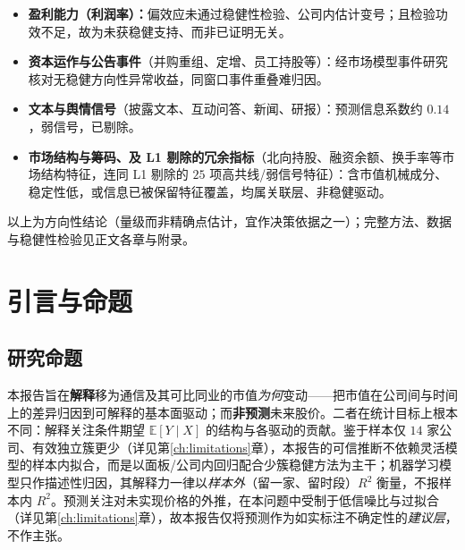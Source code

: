 \documentclass[UTF8, a4paper, fontset=none, zihao=-4]{ctexrep}
\begin{document}
{\vspace{7pt}
\begin{itemize}\setlength{\itemsep}{2pt}\setlength{\parskip}{0pt}\setlength{\topsep}{2pt}
\item \textbf{盈利能力（利润率）：}偏效应未通过稳健性检验、公司内估计变号；且检验功效不足，故为未获稳健支持、而非已证明无关。
\item \textbf{资本运作与公告事件}（并购重组、定增、员工持股等）：经市场模型事件研究核对无稳健方向性异常收益，同窗口事件重叠难归因。
\item \textbf{文本与舆情信号}（披露文本、互动问答、新闻、研报）：预测信息系数约 $0.14$，弱信号，已剔除。
\item \textbf{市场结构与筹码、及 L1 剔除的冗余指标}（北向持股、融资余额、换手率等市场结构特征，连同 L1 剔除的 $25$ 项高共线/弱信号特征）：含市值机械成分、稳定性低，或信息已被保留特征覆盖，均属关联层、非稳健驱动。
\end{itemize}

\vspace{6pt}
以上为方向性结论（量级而非精确点估计，宜作决策依据之一）；完整方法、数据与稳健性检验见正文各章与附录。
\par}
\clearpage

\tableofcontents
\thispagestyle{fancy}
\clearpage

\chapter{引言与命题}

\section{研究命题}
本报告旨在\textbf{解释}移为通信及其可比同业的市值\emph{为何}变动——把市值在公司间与时间上的差异归因到可解释的基本面驱动；而\textbf{非预测}未来股价。二者在统计目标上根本不同：解释关注条件期望 $\mathbb{E}[Y\mid X]$ 的结构与各驱动的贡献。鉴于样本仅 $14$ 家公司、有效独立簇更少（详见第\ref{ch:limitations}章），本报告的可信推断不依赖灵活模型的样本内拟合，而是以面板/公司内回归配合少簇稳健方法为主干；机器学习模型只作描述性归因，其解释力一律以\emph{样本外}（留一家、留时段）$R^2$ 衡量，不报样本内 $R^2$。预测关注对未实现价格的外推，在本问题中受制于低信噪比与过拟合（详见第\ref{ch:limitations}章），故本报告仅将预测作为如实标注不确定性的\emph{建议层}，不作主张。
\end{document}
